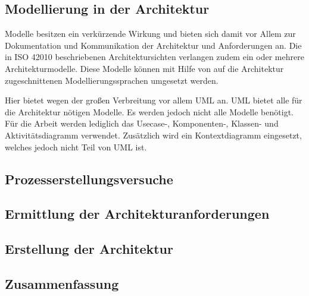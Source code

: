 \subsection{Modellierung in der Architektur}
Modelle besitzen ein verkürzende Wirkung und bieten sich damit vor Allem zur Dokumentation und Kommunikation der Architektur und Anforderungen an. Die in ISO 42010 beschriebenen Architektursichten verlangen zudem ein oder mehrere Architekturmodelle. Diese Modelle können mit Hilfe von auf die Architektur zugeschnittenen Modellierungssprachen umgesetzt werden.

Hier bietet wegen der großen Verbreitung vor allem UML an. UML bietet alle für die Architektur nötigen Modelle. Es werden jedoch nicht alle Modelle benötigt. Für die Arbeit werden lediglich das Usecase-, Komponenten-, Klassen- und Aktivitätsdiagramm verwendet. Zusätzlich wird ein Kontextdiagramm eingesetzt, welches jedoch nicht Teil von UML ist.

\subsection{Prozesserstellungsversuche}
\subsection{Ermittlung der Architekturanforderungen}
\subsection{Erstellung der Architektur}
\subsection{Zusammenfassung}